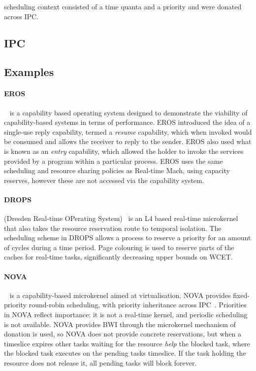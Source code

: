 \citet{Steinberg_WH_05} scheduling context consisted of a time quanta and a priority and were
donated across \gls{IPC}.

\subsection{IPC}



\subsection{Examples}


\paragraph{EROS}~\citep{Shapiro_SF_99} is a capability based operating system designed to
demonstrate the viability of capability-based systems in terms of performance.  EROS introduced the
idea of a single-use reply capability, termed a \emph{resume} capability, which when invoked would
be consumed and allows the receiver to reply to the sender.  EROS also used what is known as an
\emph{entry} capability, which allowed the holder to invoke the services provided by a program
within a particular process.  EROS uses the same scheduling and resource sharing policies as
Real-time Mach, using capacity reserves, however these are not accessed via the capability system.

\paragraph{DROPS} (Dresden Real-time OPerating System)~\citep{Haertig_BBHHMRSW_98} is an L4 based
real-time microkernel that also takes the resource reservation route to temporal isolation.  The
scheduling scheme in DROPS allows a process to reserve a priority for an amount of cycles during a
time period.  Page colouring is used to reserve parts of the caches for real-time tasks,
significantly decreasing upper bounds on \gls{WCET}.

\paragraph{NOVA}~\citep{Steinberg_Kauer_10} is a capability-based microkernel aimed at virtualisation. 
NOVA provides fixed-priority round-robin scheduling, with priority inheritance across IPC~\citep{Steinberg_BK_10}.
Priorities in NOVA reflect importance: it is not a real-time kernel, and periodic scheduling is not available.  
NOVA provides \gls{BWI} through the microkernel mechanism of donation is used, so NOVA does not
provide concrete reservations, but when a timeslice expires other tasks waiting for the resource
\emph{help} the blocked task, where the blocked task executes on the pending tasks timeslice.
If the task holding the resource does not release it, all pending tasks will block forever.


